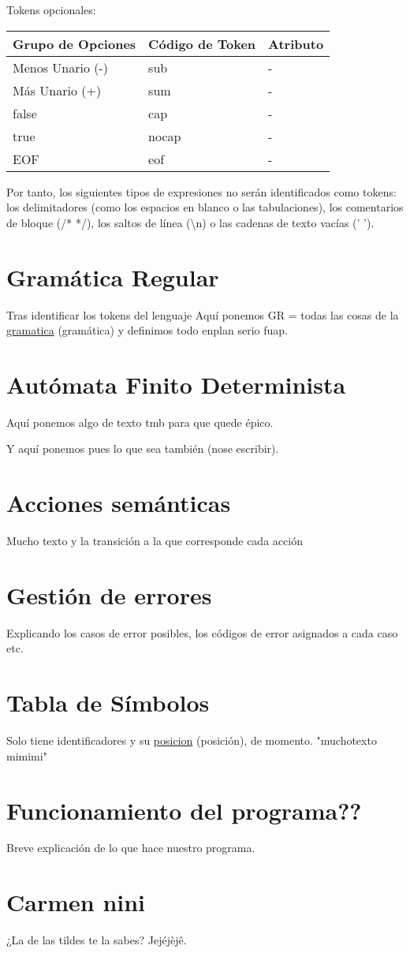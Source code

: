 \documentclass{article}
\begin{document}
Tokens opcionales:
\begin{table}[h!]
    \centering
    \begin{tabular}{|l|l|l|}
        \hline
        \textbf{Grupo de Opciones} & \textbf{Código de Token} & \textbf{Atributo} \\ \hline
        Menos Unario (-) & sub & - \\ \hline
        Más Unario (+) & sum & - \\ \hline
        false & cap & - \\ \hline
        true & nocap & - \\ \hline
        EOF & eof & - \\ \hline
    \end{tabular}
\end{table}

Por tanto, los siguientes tipos de expresiones no serán identificados como tokens: los delimitadores (como los espacios en blanco o las tabulaciones), los comentarios de bloque (/* */), los saltos de línea (\textbackslash n) o las cadenas de texto vacías (' ').

\section{Gramática Regular}
Tras identificar los tokens del lenguaje 
Aquí ponemos GR = {todas las cosas de la \underline{gramatica} (gramática)} y definimos todo enplan serio fuap.

\section{Autómata Finito Determinista}
Aquí ponemos algo de texto tmb para que quede épico.



Y aquí ponemos pues lo que sea también (nose escribir).

\section{Acciones semánticas}
Mucho texto y la transición a la que corresponde cada acción

\section{Gestión de errores}
Explicando los casos de error posibles, los códigos de error asignados a cada caso etc.

\section{Tabla de Símbolos}
Solo tiene identificadores y su \underline{posicion} (posición), de momento. "muchotexto mimimi"

\section{Funcionamiento del programa??}
Breve explicación de lo que hace nuestro programa.

\section{Carmen nini}
¿La de las tildes te la sabes? Jejéjèjê.
\end{document}
